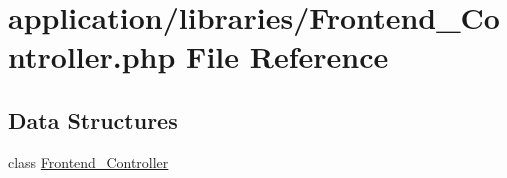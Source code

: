 \hypertarget{_frontend___controller_8php}{\section{application/libraries/\-Frontend\-\_\-\-Controller.php File Reference}
\label{_frontend___controller_8php}
}
\subsection*{Data Structures}
\begin{DoxyCompactItemize}
\item 
class \hyperlink{class_frontend___controller}{Frontend\-\_\-\-Controller}
\end{DoxyCompactItemize}
